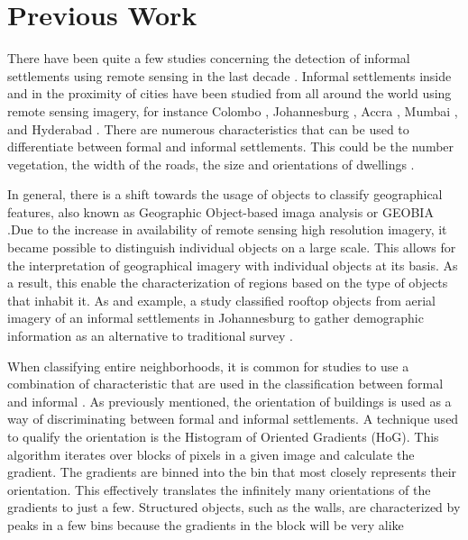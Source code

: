 \section{Previous Work}

There have been quite a few studies concerning the detection of informal
settlements using remote sensing in the last decade \cite{kuffer2016slums}.
Informal settlements inside and in the proximity of cities have been studied
from all around the world using remote sensing imagery, for instance Colombo
\cite{colombo}, Johannesburg \cite{williams2016automatic}, Accra \cite{accra},
Mumbai \cite{mumbai}, and Hyderabad \cite{hyderabad}. There are numerous
characteristics that can be used to differentiate between formal and informal
settlements. This could be the number vegetation, the width of the roads, the
size and orientations of dwellings \cite{owen2013approach}.

In general, there is a shift towards the usage of objects to classify geographical
features, also known as Geographic Object-based imaga analysis or GEOBIA
\cite{hay2008geographic}.Due to the increase in availability of remote sensing
high resolution imagery, it became possible to distinguish individual objects
on a large scale.  This allows for the
interpretation of geographical imagery with individual objects at its basis.
As a result,  this enable the characterization of regions based on the type of objects
that inhabit it.  As and example, a study classified rooftop objects from
aerial imagery of an informal settlements in Johannesburg to gather demographic
information as an alternative to traditional survey
\cite{williams2016automatic}.

When classifying entire neighborhoods, it is common for studies to use a combination
of characteristic that are used in the classification between formal and
informal \cite{graesser2012image}. As previously mentioned, the orientation of
buildings is used as a way of discriminating between formal and informal
settlements. A technique used to qualify the orientation is the Histogram of
Oriented Gradients (HoG)\cite{kumar2006discriminative}. This algorithm iterates over blocks of pixels in a given
image and calculate the gradient. The gradients are binned into
the bin that most closely represents their orientation. This effectively
translates the infinitely many orientations of the gradients to just a few.
Structured objects, such as the walls, are characterized by peaks in a few
bins because the gradients in the block will be very alike

